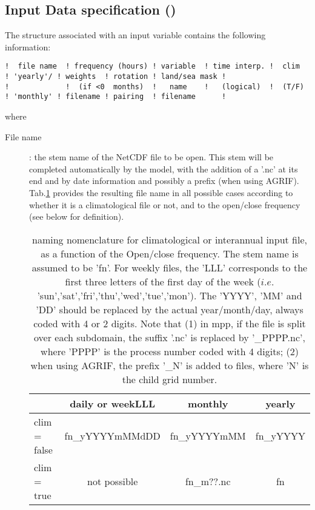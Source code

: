 \documentclass[NEMO_book]{subfiles}
\begin{document}
\subsection{Input Data specification ()}
\label{SBC_fldread}

The structure associated with an input variable contains the following information:
\begin{alltt}  {{\tiny    
\begin{verbatim}
!  file name  ! frequency (hours) ! variable  ! time interp. !  clim  ! 'yearly'/ ! weights  ! rotation ! land/sea mask ! 
!             !  (if <0  months)  !   name    !   (logical)  !  (T/F) ! 'monthly' ! filename ! pairing  ! filename      !
\end{verbatim}
}}\end{alltt} 
where 
\begin{description}  
\item[File name]: the stem name of the NetCDF file to be open. 
This stem will be completed automatically by the model, with the addition of a '.nc' at its end 
and by date information and possibly a prefix (when using AGRIF). 
Tab.\ref{Tab_fldread} provides the resulting file name in all possible cases according to whether 
it is a climatological file or not, and to the open/close frequency (see below for definition). 

\begin{table}[htbp] 
\begin{center}
\begin{tabular}{|l|c|c|c|}
\hline
                         & daily or weekLLL	        & monthly                   &   yearly          \\   \hline
clim = false	& fn\_yYYYYmMMdDD  &   fn\_yYYYYmMM   &   fn\_yYYYY  \\   \hline
clim = true	 	   & not possible 	              &  fn\_m??.nc             &   fn                \\   \hline
\end{tabular}
\end{center}
\caption{ \label{Tab_fldread}   naming nomenclature for climatological or interannual input file, 
as a function of the Open/close frequency. The stem name is assumed to be 'fn'. 
For weekly files, the 'LLL' corresponds to the first three letters of the first day of the week ($i.e.$ 'sun','sat','fri','thu','wed','tue','mon'). The 'YYYY', 'MM' and 'DD' should be replaced by the 
actual year/month/day, always coded with 4 or 2 digits. Note that (1) in mpp, if the file is split 
over each subdomain, the suffix '.nc' is replaced by '\_PPPP.nc', where 'PPPP' is the 
process number coded with 4 digits; (2) when using AGRIF, the prefix
'\_N' is added to files, 
where 'N'  is the child grid number.}
\end{table}
  


\end{description}
\end{document}

